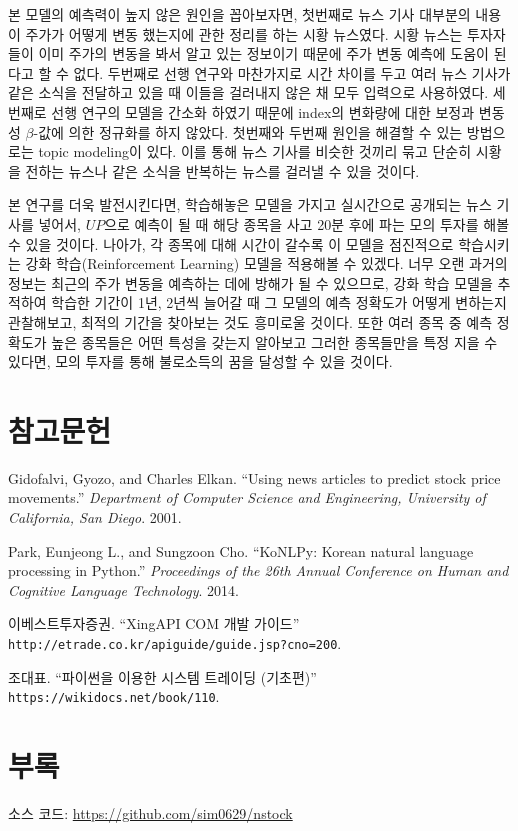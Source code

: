 \documentclass[a4paper,10pt]{article}
\begin{document}
본 모델의 예측력이 높지 않은 원인을 꼽아보자면, 첫번째로 뉴스 기사 대부분의 내용이 주가가 어떻게 변동 했는지에 관한 정리를 하는 시황 뉴스였다.
시황 뉴스는 투자자들이 이미 주가의 변동을 봐서 알고 있는 정보이기 때문에 주가 변동 예측에 도움이 된다고 할 수 없다.
두번째로 선행 연구와 마찬가지로 시간 차이를 두고 여러 뉴스 기사가 같은 소식을 전달하고 있을 때 이들을 걸러내지 않은 채 모두 입력으로 사용하였다.
세번째로 선행 연구의 모델을 간소화 하였기 때문에 index의 변화량에 대한 보정과 변동성 $\beta$-값에 의한 정규화를 하지 않았다.
첫번째와 두번째 원인을 해결할 수 있는 방법으로는 topic modeling이 있다.
이를 통해 뉴스 기사를 비슷한 것끼리 묶고 단순히 시황을 전하는 뉴스나 같은 소식을 반복하는 뉴스를 걸러낼 수 있을 것이다.

본 연구를 더욱 발전시킨다면, 학습해놓은 모델을 가지고 실시간으로 공개되는 뉴스 기사를 넣어서,
$UP$으로 예측이 될 때 해당 종목을 사고 20분 후에 파는 모의 투자를 해볼 수 있을 것이다.
나아가, 각 종목에 대해 시간이 갈수록 이 모델을 점진적으로 학습시키는 강화 학습(Reinforcement Learning) 모델을 적용해볼 수 있겠다.
너무 오랜 과거의 정보는 최근의 주가 변동을 예측하는 데에 방해가 될 수 있으므로,
강화 학습 모델을 추적하여 학습한 기간이 1년, 2년씩 늘어갈 때 그 모델의 예측 정확도가 어떻게 변하는지 관찰해보고, 최적의 기간을 찾아보는 것도 흥미로울 것이다.
또한 여러 종목 중 예측 정확도가 높은 종목들은 어떤 특성을 갖는지 알아보고 그러한 종목들만을 특정 지을 수 있다면,
모의 투자를 통해 불로소득의 꿈을 달성할 수 있을 것이다.

\section*{참고문헌}

\begin{enumerate}[ {[}1{]} ]
\item Gidofalvi, Gyozo, and Charles Elkan. ``Using news articles to predict stock price movements.'' \textit{Department of Computer Science and Engineering, University of California, San Diego}. 2001.
\item Park, Eunjeong L., and Sungzoon Cho. ``KoNLPy: Korean natural language processing in Python.'' \textit{Proceedings of the 26th Annual Conference on Human and Cognitive Language Technology}. 2014.
\item 이베스트투자증권. ``XingAPI COM 개발 가이드'' \texttt{http://etrade.co.kr/apiguide/guide.jsp?cno=200}.
\item 조대표. ``파이썬을 이용한 시스템 트레이딩 (기초편)'' \texttt{https://wikidocs.net/book/110}.
\end{enumerate}

\section*{부록}

소스 코드: \url{https://github.com/sim0629/nstock}
\end{document}
